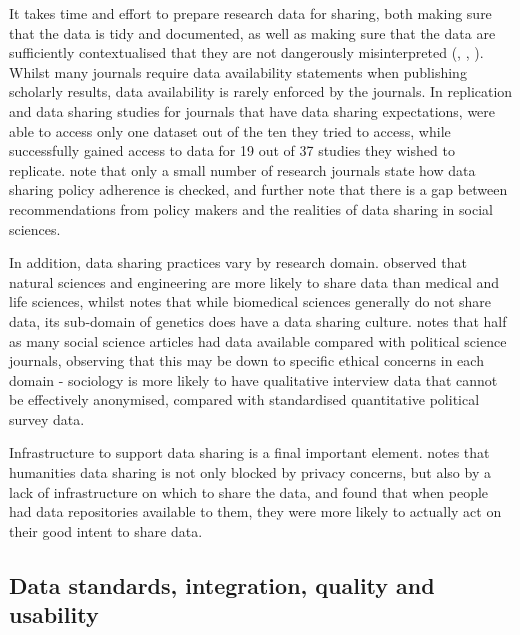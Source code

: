 \documentclass{CUP-JNL-DAP}%
\begin{document}
 It takes time and effort to prepare research data for sharing, both making sure that the data is tidy and documented, as well as making sure that the data are sufficiently contextualised that they are not dangerously misinterpreted (\cite{datasharing_rcts}, \cite{Yimei_Zhu_Open_access_in_uk}, \cite{empirical_datasharing_plos}). Whilst many journals require data availability statements when publishing scholarly results, data availability is rarely enforced by the journals. In replication and data sharing studies for journals that have data sharing expectations, \cite{empirical_datasharing_plos} were able to access only one dataset out of the ten they tried to access, while \cite{datasharing_rcts} successfully gained access to data for 19 out of 37 studies they wished to replicate. \cite{datasharing_sociology} note that only a small number of research journals state how data sharing policy adherence is checked, and further note that there is a gap between recommendations from policy makers and the realities of data sharing in social sciences. 
 
 In addition, data sharing practices vary by research domain. \cite{Yimei_Zhu_Open_access_in_uk} observed that natural sciences and engineering are more likely to share data than medical and life sciences, whilst \cite{datasharing_rcts} notes that while biomedical sciences generally do not share data, its sub-domain of genetics does have a data sharing culture. \cite{datasharing_sociology} notes that half as many social science articles had data available compared with political science journals, observing that this may be down to specific ethical concerns in each domain - sociology is more likely to have qualitative interview data that cannot be effectively anonymised, compared with standardised quantitative political survey data. 

Infrastructure to support data sharing is a final important element. \cite{Yimei_Zhu_Open_access_in_uk} notes that humanities data sharing is not only blocked by privacy concerns, but also by a lack of infrastructure on which to share the data, and \cite{Kim_Zhang_data_repos} found that when people had data repositories available to them, they were more likely to actually act on their good intent to share data.

\subsection{Data standards, integration, quality and usability}
\end{document}
